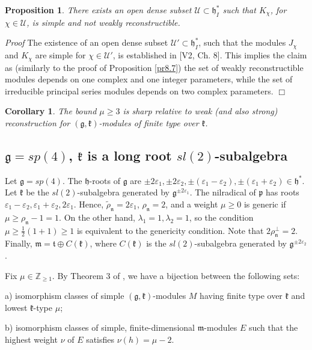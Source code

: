 \documentclass[11pt]{amsart}
\newcounter{theorem}
\newtheorem{corollary}[theo]{Corollary}
\newtheorem{prop}[theo]{Proposition}
\renewenvironment{proof}{ \emph{Proof}}{$\Box$}
\renewcommand{\tt}{\mathfrak{t}}
\newcommand{\kk}{\mathfrak{k}}
\newcommand{\nn}{\mathfrak{n}}
\newcommand{\mm}{\mathfrak{m}}
\newcommand{\hh}{\mathfrak{h}}
\newcommand{\pp}{\mathfrak{p}}
\renewcommand{\gg}{\mathfrak{g}}
\newcommand{\refprop}[1]{Proposition \ref{#1}}
\newcommand{\field}[1]{\mathbb{#1}}
\begin{document}
\begin{prop}
There exists an open dense subset $\mathcal{U}\subset\hh_I^*$ such that $K_\chi$, for $\chi\in\mathcal{U}$, is simple and not weakly reconstructible.
\end{prop}
\begin{proof}
The existence of an open dense subset $\mathcal{U'}\subset\hh_I^*$, such that the modules $J_\chi$ and $K_\chi$ are simple for $\chi\in \mathcal{U'}$, is established in [V2, Ch. 8]. This implies the claim as (similarly to the proof of \refprop{pr8.7}) the set of weakly reconstructible modules depends on one complex and one integer parameters, while the set of irreducible principal series modules depends on two complex parameters.
\end{proof}
\begin{corollary}
The bound $\mu\geq 3$ is sharp relative to weak (and also strong) reconstruction for $(\gg,\kk)$-modules of finite type over $\kk$.
\end{corollary}

\subsection{$\gg=sp(4)$, $\kk$ is a long root $sl(2)$-subalgebra} %

Let $\gg=sp(4)$. The $\hh$-roots of $\gg$ are $\pm 2\varepsilon_1, \pm 2\varepsilon_2, \pm(\varepsilon_1-\varepsilon_2),\pm(\varepsilon_1+\varepsilon_2)\in\hh^*$. Let $\kk$ be the $sl(2)$-subalgebra generated by $\gg^{\pm 2\varepsilon_1}$. The nilradical of $\pp$ has roots $\varepsilon_1-\varepsilon_2,\varepsilon_1+\varepsilon_2,2\varepsilon_1$. Hence, $\tilde{\rho}_\nn=2\varepsilon_1$, $\rho_\nn=2$, and a weight $\mu\geq 0$ is generic if $\mu\geq\rho_\nn-1=1$. On the other hand, $\lambda_1=1,\lambda_2=1$, so the condition $\mu\geq\frac{1}{2}(1+1)\geq 1$ is equivalent to the genericity condition. Note that $2\rho_\nn^\perp=2$. Finally, $\mm=\tt\oplus C(\kk)$, where $C(\kk)$ is the $sl(2)$-subalgebra generated by $\gg^{\pm 2\varepsilon_2}$.

Fix $\mu\in\field{Z}_{\geq 1}$. By Theorem 3 of \cite{PZ2}, we have a bijection between the following sets:

a) isomorphism classes of simple $(\gg,\kk)$-modules $M$ having finite type over $\kk$ and lowest $\kk$-type $\mu$;

b) isomorphism classes of simple, finite-dimensional $\mm$-modules $E$ such that the highest weight $\nu$ of $E$ satisfies $\nu(h)=\mu-2$.
\end{document}
